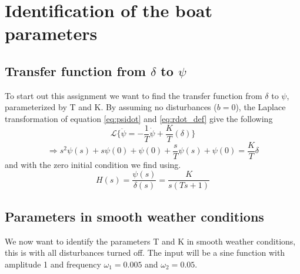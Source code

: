 
\section{Identification of the boat parameters} \label{sec:part1}

\subsection{Transfer function from $\delta$ to $\psi$}
To start out this assignment we want to find the transfer function from $\delta$ to $\psi$, parameterized by T and K. By assuming no disturbances ($b=0$), the Laplace transformation of equation \cref{eq:psidot} and \cref{eq:rdot_def} give the following
\begin{equation}
    \mathscr{L}\{\ddot{\psi} = -\frac{1}{T}\dot{\psi} + \frac{K}{T}(\delta)\}
\end{equation}
\begin{equation*}
    \Rightarrow s^2\psi(s)+ s\psi(0) + \psi(0) + \frac{s}{T}\psi(s)+ \psi(0) = \frac{K}{T}\delta
\end{equation*}
and with the zero initial condition we find using.
\begin{equation} 
    H(s) =  \frac{\psi(s)}{\delta(s)} = \frac{K}{s(Ts+1)}
\end{equation}




\subsection{Parameters in smooth weather conditions}\label{1.b}
We now want to identify the parameters T and K in smooth weather conditions, this is with all disturbances turned off.  The input will be a sine function with amplitude 1 and frequency $\omega_1 = 0.005$ and $\omega_2 = 0.05$. 

